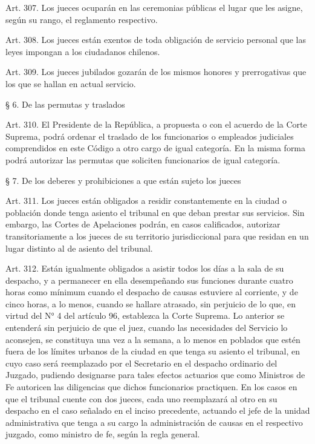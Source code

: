     Art. 307. Los jueces ocuparán en las ceremonias públicas el lugar que les asigne, según su rango, el reglamento respectivo.

    Art. 308. Los jueces están exentos de toda obligación de servicio personal que las leyes impongan a los ciudadanos chilenos.

    Art. 309. Los jueces jubilados gozarán de los mismos honores y prerrogativas que los que se hallan en actual servicio.

    § 6. De las permutas y traslados


    Art. 310. El Presidente de la República, a propuesta o con el acuerdo de la Corte Suprema, podrá ordenar el traslado de los funcionarios o empleados judiciales comprendidos en este Código a otro cargo de igual categoría. En la misma forma podrá autorizar las permutas que soliciten funcionarios de igual categoría.

    § 7. De los deberes y prohibiciones a que están sujeto los jueces


    Art. 311. Los jueces están obligados a residir constantemente en la ciudad o población donde tenga asiento el tribunal en que deban prestar sus servicios.
    Sin embargo, las Cortes de Apelaciones podrán, en casos calificados, autorizar transitoriamente a los jueces de su territorio jurisdiccional para que residan en un lugar distinto al de asiento del tribunal.


    Art. 312. Están igualmente obligados a asistir todos los días a la sala de su despacho, y a permanecer en ella desempeñando sus funciones durante cuatro horas como mínimum cuando el despacho de causas estuviere al corriente, y de cinco horas, a lo menos, cuando se hallare atrasado, sin perjuicio de lo que, en virtud del N° 4 del artículo 96, establezca la Corte Suprema.
    Lo anterior se entenderá sin perjuicio de que el juez, cuando las necesidades del Servicio lo aconsejen, se constituya una vez a la semana, a lo menos en poblados que estén fuera de los límites urbanos de la ciudad en que tenga su asiento el tribunal, en cuyo caso será reemplazado por el Secretario en el despacho ordinario del Juzgado, pudiendo designarse para tales efectos actuarios que como Ministros de Fe autoricen las diligencias que dichos funcionarios practiquen.
    En los casos en que el tribunal cuente con dos jueces, cada uno reemplazará al otro en su despacho en el caso señalado en el inciso precedente, actuando el jefe de la unidad administrativa que tenga a su cargo la administración de causas en el respectivo juzgado, como ministro de fe, según la regla general.

